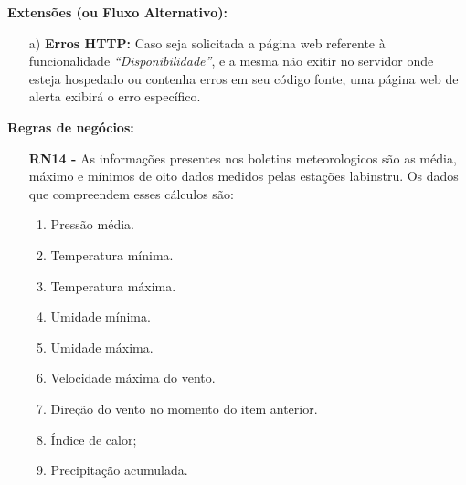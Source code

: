\begin{quadro}[H]
\begin{framed}
\begin{flushleft}
		\textbf{Extensões (ou Fluxo Alternativo):}
		\begin{itemize}
			\item[a)] \textbf{Erros HTTP:} Caso seja solicitada a página web referente à funcionalidade \textit{``Disponibilidade''}, e a mesma não exitir no servidor onde esteja hospedado ou contenha erros em seu código fonte, uma página web de alerta exibirá o erro específico.
		\end{itemize}

		\textbf{Regras de negócios:}
		\begin{itemize}

			\item[] \textbf{RN14 - } As informações presentes nos boletins meteorologicos são as média, máximo e mínimos de oito dados medidos pelas estações labinstru. Os dados que compreendem esses cálculos são:
				\begin{enumerate}
					\item{Pressão média.}
					\item{Temperatura mínima.}
					\item{Temperatura máxima.}
					\item{Umidade mínima.}
					\item{Umidade máxima.}
					\item{Velocidade máxima do vento.}
					\item{Direção do vento no momento do item anterior.}
          \item Índice de calor;
					\item{Precipitação acumulada.}
				\end{enumerate}

		\end{itemize}

		\end{flushleft}

	\end{framed}

\end {quadro} %
